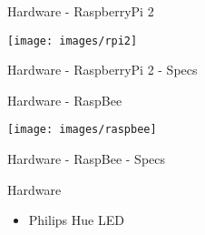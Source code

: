 \begin{frame}{Hardware - RaspberryPi 2}
  \begin{center}
    \texttt{[image: images/rpi2]}
    \label{fig:rpi}
  \end{center}
\end{frame}

\begin{frame}{Hardware - RaspberryPi 2 - Specs}
\end{frame}

\begin{frame}{Hardware - RaspBee}
  \begin{center}
    \texttt{[image: images/raspbee]}
    \label{fig:rbee}
  \end{center}
\end{frame}

\begin{frame}{Hardware - RaspBee - Specs}
\end{frame}

\begin{frame}{Hardware}
  \begin{itemize}
	\item Philips Hue LED
  \end{itemize}
\end{frame}